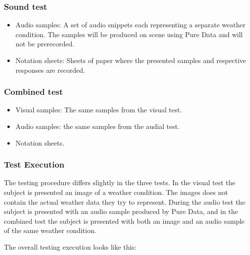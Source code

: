 

\subsubsection*{Sound test} %
\label{ssub:sound_test}

\begin{itemize}
    \item Audio samples: A set of audio snippets each representing a separate weather condition. The samples will be produced on scene using Pure Data and will not be prerecorded.
    \item Notation sheets: Sheets of paper where the presented samples and respective responses are recorded.
\end{itemize}


\subsubsection*{Combined test} %
\label{ssub:combined_test}

\begin{itemize}
    \item Visual samples: The same samples from the visual test.
    \item Audio samples: the same samples from the audial test.
    \item Notation sheets.
\end{itemize}




\subsubsection{Test Execution} %
\label{ssub:test_execution}

The testing procedure differs slightly in the three tests. 
In the visual test the subject is presented an image of a weather condition. 
The images does not contain the actual weather data they try to represent. 
During the audio test the subject is presented with an audio sample produced by Pure Data, and in the combined test the subject is presented with both an image and an audio sample of the same weather condition.


The overall testing execution looks like this:

